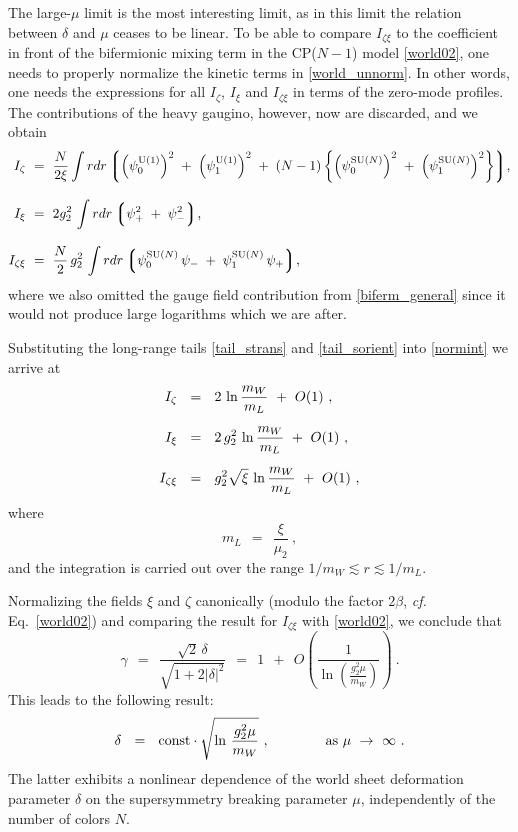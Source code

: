 \documentclass[12pt]{article}
\def\beq{\begin{equation}}
\def\eeq{\end{equation}}
\newcommand{\lgr}{\left\lgroup}
\newcommand{\rgr}{\right\rgroup}
\newcommand{\poU}{\psi_0^{\rm U(1)}}
\newcommand{\plU}{\psi_1^{\rm U(1)}}
\newcommand{\poN}{\psi_0^\text{SU($N$)}}
\newcommand{\plN}{\psi_1^\text{SU($N$)}}
\begin{document}
	The large-$\mu$ limit is the most interesting limit, as in this limit the relation between $ \delta $ 
	and $ \mu $ ceases to be linear. 
	To be able to compare $ I_{\zeta\xi} $ to the coefficient in front of the bifermionic mixing term in 
	the CP($ N-1 $) model \eqref{world02}, one needs to properly normalize the kinetic terms in \eqref{world_unnorm}.
	In other words, one needs the expressions for all  $ I_\zeta $, $ I_\xi $ and $ I_{\zeta\xi} $ in terms
	of the zero-mode profiles.
	The contributions of the heavy gaugino, however, now are discarded, and we obtain
\begin{align}
%
\notag
	I_\zeta & ~=~ \frac{N}{2\xi} 
		\int r dr 
			\lgr \left(\poU\right)^2 \;+\; \left(\plU\right)^2 \;+\; 
				(N-1)\left\{\left(\poN\right)^2 \;+\;
				            \left(\plN\right)^2 \right\} 
			\rgr \!, \\[3mm]
%
\label{normint}
	I_\xi & ~=~ 2g_2^2\, 
		\int r dr \lgr  \psi_+^2 \;+\; \psi_-^2 \rgr\!, \\[3mm]
%
\notag
	I_{\zeta\xi} & ~=~
		\frac{N}{2}\, g_2^2\, 
		\int r dr \lgr \poN\, \psi_- \;+\; \plN\, \psi_+ \rgr \!,
\end{align}
	where we also omitted the gauge field contribution from \eqref{biferm_general} since it would not
	produce large logarithms which we are after. 

	Substituting the long-range tails \eqref{tail_strans} and \eqref{tail_sorient} into \eqref{normint}
	we arrive at
\begin{align}
%
\notag
	I_\zeta & ~~=~~ 2\, \ln \frac{m_W}{m_L} ~+~ O(1)~, \\[2mm]
%
\label{logs}
	I_\xi & ~~=~~ 2\,g_2^2 \, \ln \frac{m_W}{m_L} ~+~ O(1)~, \\[2mm]
%
\notag
	I_{\zeta\xi} & ~~=~~ g_2^2\sqrt{\xi}\, \ln \frac{m_W}{m_L} ~+~ O(1)~, 
\end{align}
	where
\[
	m_L ~~=~~ \frac{\xi}{\mu_2}~,
\]
	and the integration is carried out over the range $ 1/m_W \lesssim r \lesssim 1/m_L $.

	Normalizing the fields $ \xi $ and $ \zeta $ canonically (modulo the factor  $ 2\beta $, 
	{\it cf.} Eq.~\eqref{world02}) and comparing the result for $ I_{\zeta\xi} $ with \eqref{world02},
	we conclude that
\beq
\label{gammaresult}
	\gamma ~~=~~ 
		\frac { \sqrt{2}\,\delta } { \sqrt{ 1 + 2 | \delta |^2 } } 
		~~=~~ 1 ~~+~~ O\left(\frac{1}{\ln\left(\frac{g_2^2\mu}{m_W}\right)}\right)~.
\eeq
	This leads to the following result:
\beq
\label{deltaresult}
	\delta~~=~~ 
	{\rm const} \cdot \sqrt{\ln\, \frac{g_2^2\mu}{m_W}}~,
	\qquad\qquad \text{as $\mu ~\to~ \infty$}~.
\eeq
	The latter exhibits a nonlinear dependence of the world sheet deformation 
	parameter $ \delta $ on the 
	supersymmetry breaking parameter $ \mu $, independently of the number of colors $ N $.
\end{document}

